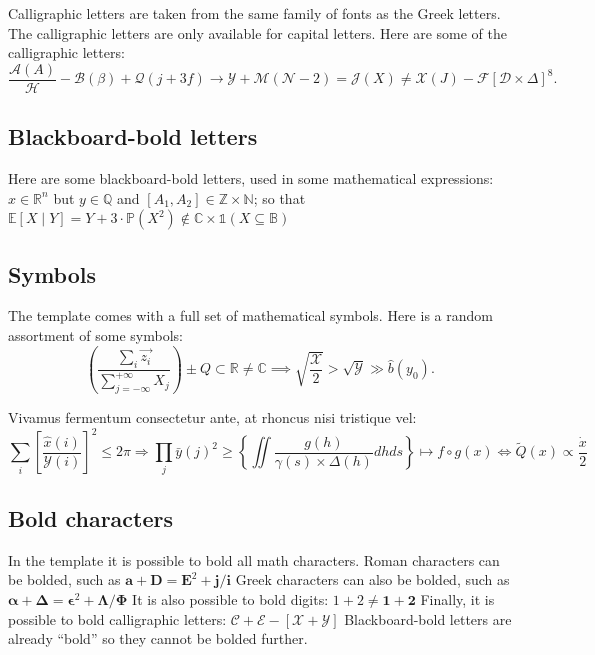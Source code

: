 \documentclass{article}
\begin{document}
Calligraphic letters are taken from the same family of fonts as the Greek letters. The calligraphic letters are only available for capital letters. Here are some of the calligraphic letters: 
\[

\frac{\mathcal{A}(A)}{\mathcal{H}} - \mathcal{B}(\beta) + \mathcal{Q}(j+3f) \to \mathcal{Y} + \mathcal{M}(\mathcal{N} - 2) = \mathcal{J}(X) \neq \mathcal{X}(J) - \mathcal{F}[\mathcal{D} \times \Delta]^8. 

\]

\subsection{Blackboard-bold letters} 

Here are some blackboard-bold letters, used in some mathematical expressions: $x \in\mathbb{R}^n$ but $y\in \mathbb{Q}$ and $[A_1,A_2] \in \mathbb{Z} \times \mathbb{N}$; so that $\mathbb{E}[X\mid Y] = Y + 3 \cdot \mathbb{P}(X^2) \notin \mathbb{C} \times \mathbb{1}(X \subseteq \mathbb{B})$

\subsection{Symbols} 

The template comes with a full set of mathematical symbols. Here is a random assortment of some symbols: 
\[

\left(\frac{\sum_i \vec{z_i}}{\sum_{j=-\infty}^{+\infty} X_j}\right) \pm Q \subset \mathbb{R} \neq \mathbb{C} \implies \sqrt{\frac{\mathcal{X}}{2}} > \sqrt{\mathcal{Y}} \gg \hat{b}(y_0).

\]

 \wcTpLoremIpsum*[type=sentence,words-per-sentence=38,seed=119]{}  Vivamus fermentum consectetur ante, at rhoncus nisi tristique vel:
\[

\sum_i \left[\frac{\hat{x}(i)}{\mathcal{Y}(i)}\right]^2 \leq 2\pi \Rightarrow \prod_j \bar{y}(j)^2 \geq \left\lbrace \iint \frac{g(h)}{\gamma(s) \times \Delta(h)} dh ds \right\rbrace  \mapsto f\circ g(x) \iff \tilde{Q}(x) \propto \frac{\dot{x}}{2}

\]

\subsection{Bold characters}

In the template it is possible to bold all math characters. Roman characters can be bolded, such as $\boldsymbol{a} + \boldsymbol{D} = \boldsymbol{E}^2 + \boldsymbol{j}/\boldsymbol{i}$ Greek characters can also be bolded, such as $\boldsymbol{\alpha} + \boldsymbol{\Delta} = \boldsymbol{\epsilon}^2 + \boldsymbol{\Lambda}/\boldsymbol{\Phi}$ It is also possible to bold digits: $1 + 2 \neq \boldsymbol{1} + \boldsymbol{2}$ Finally, it is possible to bold calligraphic letters: $\boldsymbol{\mathcal{C}} + \boldsymbol{\mathcal{E}} - [\boldsymbol{\mathcal{X}}+\boldsymbol{\mathcal{Y}}]$ Blackboard-bold letters are already ``bold'' so they cannot be bolded further.
\end{document}
